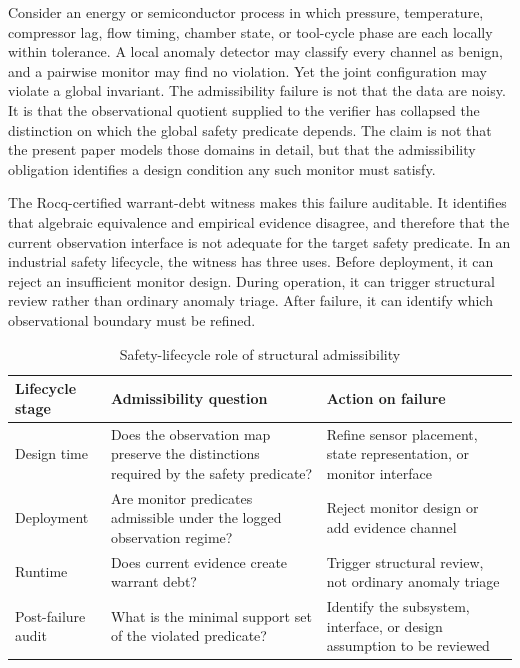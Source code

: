 \documentclass[pdflatex,sn-mathphys-num]{sn-jnl}
\theoremstyle{plain}
\theoremstyle{definition}
\theoremstyle{remark}
\begin{document}
Consider an energy or semiconductor process in which pressure,
temperature, compressor lag, flow timing, chamber state, or tool-cycle
phase are each locally within tolerance.
A local anomaly detector may classify every channel as benign, and a
pairwise monitor may find no violation.
Yet the joint configuration may violate a global invariant.
The admissibility failure is not that the data are noisy.
It is that the observational quotient supplied to the verifier has
collapsed the distinction on which the global safety predicate depends.
The claim is not that the present paper models those domains in detail,
but that the admissibility obligation identifies a design condition any
such monitor must satisfy.

The Rocq-certified warrant-debt witness makes this failure auditable.
It identifies that algebraic equivalence and empirical evidence disagree,
and therefore that the current observation interface is not adequate for
the target safety predicate.
In an industrial safety lifecycle, the witness has three uses.
Before deployment, it can reject an insufficient monitor design.
During operation, it can trigger structural review rather than ordinary
anomaly triage.
After failure, it can identify which observational boundary must be
refined.

\begin{table}[t]
\caption{Safety-lifecycle role of structural admissibility}
\label{tab:safety-lifecycle}
\centering
\begin{tabular}{p{2.8cm}p{4.5cm}p{4.5cm}}
\toprule
Lifecycle stage & Admissibility question & Action on failure \\
\midrule
Design time
  & Does the observation map preserve the distinctions required by the
    safety predicate?
  & Refine sensor placement, state representation, or monitor interface \\[4pt]
Deployment
  & Are monitor predicates admissible under the logged observation regime?
  & Reject monitor design or add evidence channel \\[4pt]
Runtime
  & Does current evidence create warrant debt?
  & Trigger structural review, not ordinary anomaly triage \\[4pt]
Post-failure audit
  & What is the minimal support set of the violated predicate?
  & Identify the subsystem, interface, or design assumption to be
    reviewed \\
\bottomrule
\end{tabular}
\end{table}
\end{document}
